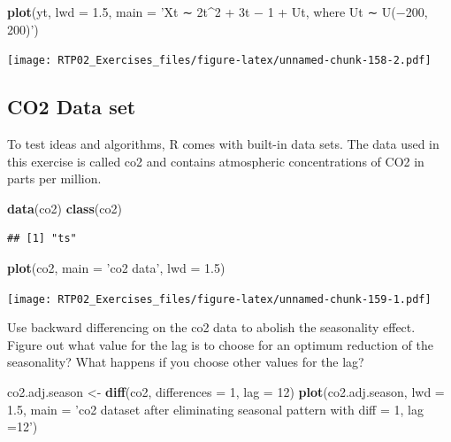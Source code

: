\documentclass[
]{article}
\newenvironment{Shaded}{\begin{snugshade}}{\end{snugshade}}
\newcommand{\DataTypeTok}[1]{\textcolor[rgb]{0.13,0.29,0.53}{#1}}
\newcommand{\DecValTok}[1]{\textcolor[rgb]{0.00,0.00,0.81}{#1}}
\newcommand{\FloatTok}[1]{\textcolor[rgb]{0.00,0.00,0.81}{#1}}
\newcommand{\KeywordTok}[1]{\textcolor[rgb]{0.13,0.29,0.53}{\textbf{#1}}}
\newcommand{\NormalTok}[1]{#1}
\newcommand{\StringTok}[1]{\textcolor[rgb]{0.31,0.60,0.02}{#1}}
\begin{document}
\begin{Shaded}
\begin{Highlighting}[]
\KeywordTok{plot}\NormalTok{(yt, }\DataTypeTok{lwd =} \FloatTok{1.5}\NormalTok{, }\DataTypeTok{main =} \StringTok{'Xt ∼ 2t^2 + 3t − 1 + Ut, where Ut ∼ U(−200, 200)'}\NormalTok{)}
\end{Highlighting}
\end{Shaded}

\texttt{[image: RTP02\_Exercises\_files/figure-latex/unnamed-chunk-158-2.pdf]}

\hypertarget{co2-data-set}{%
\subsection{CO2 Data set}\label{co2-data-set}}

To test ideas and algorithms, R comes with built-in data sets. The data
used in this exercise is called co2 and contains atmospheric
concentrations of CO2 in parts per million.

\begin{Shaded}
\begin{Highlighting}[]
\KeywordTok{data}\NormalTok{(co2)}
\KeywordTok{class}\NormalTok{(co2)}
\end{Highlighting}
\end{Shaded}

\begin{verbatim}
## [1] "ts"
\end{verbatim}

\begin{Shaded}
\begin{Highlighting}[]
\KeywordTok{plot}\NormalTok{(co2, }\DataTypeTok{main =} \StringTok{'co2 data'}\NormalTok{, }\DataTypeTok{lwd =} \FloatTok{1.5}\NormalTok{)}
\end{Highlighting}
\end{Shaded}

\texttt{[image: RTP02\_Exercises\_files/figure-latex/unnamed-chunk-159-1.pdf]}

Use backward differencing on the co2 data to abolish the seasonality
effect. Figure out what value for the lag is to choose for an optimum
reduction of the seasonality? What happens if you choose other values
for the lag?

\begin{Shaded}
\begin{Highlighting}[]
\NormalTok{co2.adj.season <-}\StringTok{ }\KeywordTok{diff}\NormalTok{(co2, }\DataTypeTok{differences =} \DecValTok{1}\NormalTok{, }\DataTypeTok{lag =} \DecValTok{12}\NormalTok{)}
\KeywordTok{plot}\NormalTok{(co2.adj.season, }\DataTypeTok{lwd =} \FloatTok{1.5}\NormalTok{, }\DataTypeTok{main =} \StringTok{'co2 dataset after eliminating seasonal pattern with diff = 1, lag =12'}\NormalTok{)}
\end{Highlighting}
\end{Shaded}
\end{document}
